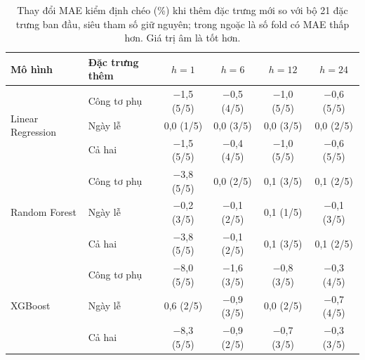 \begin{table}[htbp]
\centering
\caption[Tác động của đặc trưng mới]{Thay đổi MAE kiểm định chéo (\%) khi thêm đặc trưng mới so với bộ 21 đặc trưng ban đầu, siêu tham số giữ nguyên; trong ngoặc là số fold có MAE thấp hơn. Giá trị âm là tốt hơn.}
\label{tab:feat_delta}
\small
\begin{tabular}{|l|l|c|c|c|c|}
\hline
\textbf{Mô hình} & \textbf{Đặc trưng thêm} & \textbf{$h = 1$} & \textbf{$h = 6$} & \textbf{$h = 12$} & \textbf{$h = 24$} \\
\hline
\multirow{3}{*}{Linear Regression} & Công tơ phụ & $-$1{,}5 (5/5) & $-$0{,}5 (4/5) & $-$1{,}0 (5/5) & $-$0{,}6 (5/5) \\
\cline{2-6}
 & Ngày lễ & 0{,}0 (1/5) & 0{,}0 (3/5) & 0{,}0 (3/5) & 0{,}0 (2/5) \\
\cline{2-6}
 & Cả hai & $-$1{,}5 (5/5) & $-$0{,}4 (4/5) & $-$1{,}0 (5/5) & $-$0{,}6 (5/5) \\
\hline
\multirow{3}{*}{Random Forest} & Công tơ phụ & $-$3{,}8 (5/5) & 0{,}0 (2/5) & 0{,}1 (3/5) & 0{,}1 (2/5) \\
\cline{2-6}
 & Ngày lễ & $-$0{,}2 (3/5) & $-$0{,}1 (2/5) & 0{,}1 (1/5) & $-$0{,}1 (3/5) \\
\cline{2-6}
 & Cả hai & $-$3{,}8 (5/5) & $-$0{,}1 (2/5) & 0{,}1 (3/5) & 0{,}1 (2/5) \\
\hline
\multirow{3}{*}{XGBoost} & Công tơ phụ & $-$8{,}0 (5/5) & $-$1{,}6 (3/5) & $-$0{,}8 (3/5) & $-$0{,}3 (4/5) \\
\cline{2-6}
 & Ngày lễ & 0{,}6 (2/5) & $-$0{,}9 (3/5) & 0{,}0 (2/5) & $-$0{,}7 (4/5) \\
\cline{2-6}
 & Cả hai & $-$8{,}3 (5/5) & $-$0{,}9 (2/5) & $-$0{,}7 (3/5) & $-$0{,}3 (3/5) \\
\hline
\end{tabular}
\end{table}
